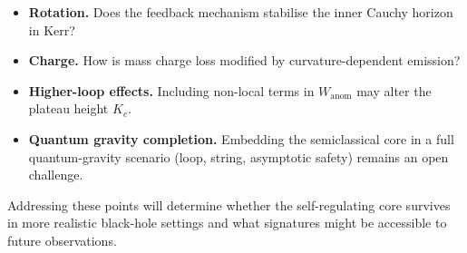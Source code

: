 \begin{itemize}
\item \textbf{Rotation.} Does the feedback mechanism stabilise the inner Cauchy horizon in Kerr?
\item \textbf{Charge.} How is mass charge loss modified by curvature-dependent emission?
\item \textbf{Higher-loop effects.} Including non-local terms in $W_{\text{anom}}$ may alter the plateau height $K_c$.
\item \textbf{Quantum gravity completion.} Embedding the semiclassical core in a full quantum-gravity scenario (loop, string, asymptotic safety) remains an open challenge.
\end{itemize}

Addressing these points will determine whether the self-regulating core survives in more realistic black-hole settings and what signatures might be accessible to future observations.


